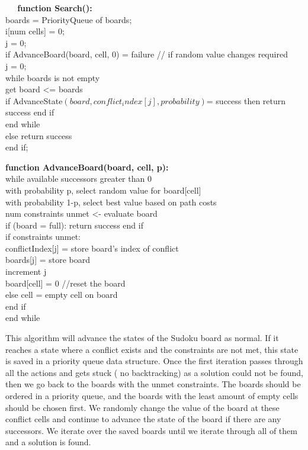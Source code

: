\begin{singlespace}
$\>$$\>$$\>$$\>$$\>$ \textbf{function Search():} \\
boards = PriorityQueue of boards; \\
i[num cells] = 0; \\
j = 0; \\
if AdvanceBoard(board, cell, 0) = failure	// if random value changes required \\
j = 0; \\ 
while boards is not empty \\
get board <= boards \\
if AdvanceState$(board, conflict_index[j], probability)$= success then  return success  end if\\
end while \\
else 	return success \\
end if; 


\textbf{function AdvanceBoard(board, cell, p):} \\
while available successors greater than 0 \\
with probability p, select random value for board[cell] \\
with probability 1-p, select best value based on path costs \\
num constraints unmet <- evaluate board \\
if (board = full): return success  end if\\
if constraints unmet: \\
conflictIndex[j] = store board's index of conflict \\
boards[j] = store board \\
increment j \\ 
board[cell] = 0 		//reset the board \\
else	cell = empty cell on board \\
end if \\
end while 
\end{singlespace}

This algorithm will advance the states of the Sudoku board as normal. If it reaches a state where a conflict exists and the constraints are not met, this state is saved in a priority queue data structure. Once the first iteration passes  through all the actions and gets stuck ( no backtracking) as a solution could not be found, then we go back to the boards with the unmet constraints.
The boards should be ordered in a priority queue, and the boards with the least amount of empty cells should be chosen first. We randomly change the value of the board at these conflict cells and continue to advance the state of the board if there are any successors. We iterate over the saved boards until we iterate through all of them and a solution is found.

